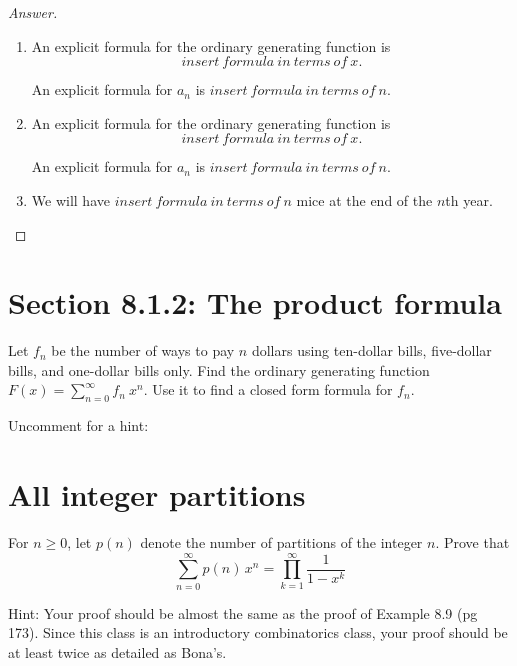 \documentclass[10pt]{amsart}
\begin{document}
\begin{proof}[Answer]
\begin{enumerate}
\item 
An explicit formula for the ordinary generating function is \[\boxed{insert ~ formula ~ in ~ terms ~ of ~ x}.\]

An explicit formula for $a_n$ is $\boxed{insert ~ formula ~ in ~ terms ~ of ~ n}$.

\item 
An explicit formula for the ordinary generating function is \[\boxed{insert ~ formula ~ in ~ terms ~ of ~ x}.\]

An explicit formula for $a_n$ is $\boxed{insert ~ formula ~ in ~ terms ~ of ~ n}$.


\item 
We will have $\boxed{insert ~ formula ~ in ~ terms ~ of ~ n}$ mice at the end of the $n$th year.

\end{enumerate}
\end{proof}




\section{Section 8.1.2: The product formula}
Let $f_n$ be the number of ways to pay $n$ dollars using ten-dollar bills, five-dollar bills, and one-dollar bills only. 
Find the ordinary generating function $F(x) = \sum_{n=0}^\infty f_n ~ x^n$. Use it to find a closed form formula for $f_n$. 

\noindent Uncomment for a hint:




\section{All integer partitions}
For $n \geq 0$, let $p(n)$ denote the number of partitions of the integer $n$.
Prove that
\[
\sum_{n=0}^\infty p(n) \, x^n = \prod_{k=1}^\infty \frac{1}{1-x^k}
\]

\noindent Hint: Your proof should be almost the same as the proof of Example 8.9 (pg 173). Since this class is an introductory combinatorics class, your proof should be at least twice as detailed as Bona's. 
\end{document}
